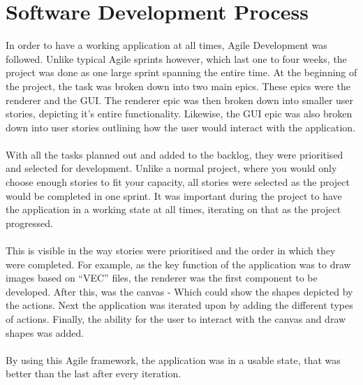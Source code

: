 \section{Software Development Process}

In order to have a working application at all times, Agile Development was followed.
Unlike typical Agile sprints however, which last one to four weeks, the project was done as one large sprint spanning the entire time.
At the beginning of the project, the task was broken down into two main epics.
These epics were the renderer and the GUI.
The renderer epic was then broken down into smaller user stories, depicting it's entire functionality.
Likewise, the GUI epic was also broken down into user stories outlining how the user would interact with the application.
\\\\
With all the tasks planned out and added to the backlog, they were prioritised and selected for development.
Unlike a normal project, where you would only choose enough stories to fit your capacity, all stories were selected as the project would be completed in one sprint.
It was important during the project to have the application in a working state at all times, iterating on that as the project progressed.
\\\\
This is visible in the way stories were prioritised and the order in which they were completed.
For example, as the key function of the application was to draw images based on ``VEC'' files, the renderer was the first component to be developed.
After this, was the canvas - Which could show the shapes depicted by the actions.
Next the application was iterated upon by adding the different types of actions.
Finally, the ability for the user to interact with the canvas and draw shapes was added.
\\\\
By using this Agile framework, the application was in a usable state, that was better than the last after every iteration.
\begin{center}\end{center}
